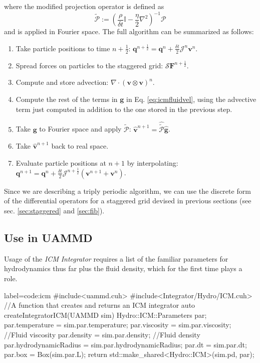 \documentclass[ twoside,openright,titlepage,numbers=noenddot,%
headinclude,footinclude,cleardoublepage=empty,abstract=on,
BCOR=5mm,paper=b5,fontsize=11pt, dvipsnames
]{scrreprt}
\renewcommand{\vec}[1]{\bm{#1}}
\newcommand{\oper}[1]{\mathcal{#1}}
\newcommand{\dt}{\delta t}
\newcommand{\half}{\frac{1}{2}}
\newcommand{\fou}[1]{\widehat{#1}}
\newcommand{\ppos}{q}
\newcommand{\fvel}{v}
\begin{document}
where the modified projection operator is defined as
\begin{equation}
  \tilde{\oper{P}} :=\left(\frac{\rho}{\dt}\mathbb{I} - \frac{\eta}{2}\nabla^2\right)^{-1}\oper{P}
\end{equation}
and is applied in Fourier space.
The full algorithm can be summarized as follows:
\begin{enumerate}
\item Take particle positions to time $n+\half$: $\vec{\ppos}^{n+\half} = \vec{\ppos}^n + \frac{\dt}{2}\oper{J}^n\vec{\fvel}^n$.
\item Spread forces on particles to the staggered grid: $\oper{S}\vec{F}^{n+\half}$.
\item Compute and store advection: $\nabla\cdot (\vec{\fvel}\otimes\vec{\fvel})^n$.
\item Compute the rest of the terms in $\vec{g}$ in Eq. \eqref{eq:icmfluidvel}, using the advective term just computed in addition to the one stored in the previous step.
\item Take $\vec{g}$ to Fourier space and apply $\tilde{\oper{P}}$: $\fou{\vec{\fvel}}^{n+1} = \fou{\tilde{\oper{P}}}\fou{\vec{g}}$.
\item Take $\fou{\vec{\fvel}}^{n+1}$ back to real space.
\item Evaluate particle positions at $n+1$ by interpolating: $\vec{\ppos}^{n+1} = \vec{\ppos}^n + \frac{\dt}{2}\oper{J}^{n+\half}\left(\vec{\fvel}^{n+1} + \vec{\fvel}^{n}\right)$.
\end{enumerate}
Since we are describing a triply periodic algorithm, we can use the discrete form of the differential operators for a staggered grid devised in previous sections (see sec. \ref{sec:staggered} and \ref{sec:fib}).


\subsection*{Use in UAMMD}
Usage of the \emph{ICM} \emph{Integrator} requires a list of the familiar parameters for hydrodynamics thus far plus the fluid density, which for the first time plays a role.

\begin{code2}{label=code:icm}
#include<uammd.cuh>
#include<Integrator/Hydro/ICM.cuh>
//A function that creates and returns an ICM integrator
auto createIntegratorICM(UAMMD sim){
  Hydro::ICM::Parameters par;
  par.temperature = sim.par.temperature;
  par.viscosity = sim.par.viscosity; //Fluid viscosity
  par.density = sim.par.density;   //Fluid density
  par.hydrodynamicRadius = sim.par.hydrodynamicRadius;
  par.dt = sim.par.dt;
  par.box = Box(sim.par.L);
  return std::make_shared<Hydro::ICM>(sim.pd, par);
}
\end{code2}
\end{document}
